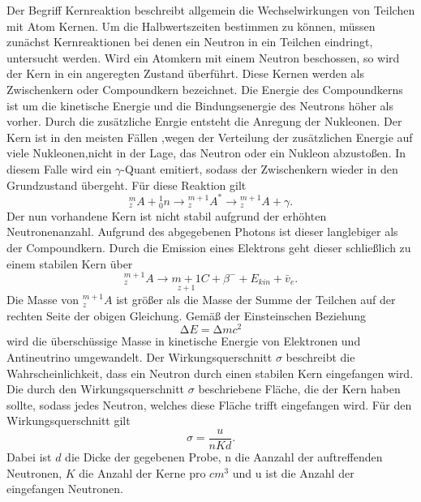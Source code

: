 Der Begriff Kernreaktion beschreibt allgemein die Wechselwirkungen von Teilchen mit Atom Kernen.
Um die Halbwertszeiten bestimmen zu können, müssen zunächst Kernreaktionen bei denen ein Neutron in ein Teilchen
eindringt, untersucht werden. Wird ein Atomkern mit einem Neutron beschossen, so wird der Kern in ein angeregten Zustand überführt.
Diese Kernen werden als Zwischenkern oder Compoundkern bezeichnet.
Die Energie des Compoundkerns ist um die kinetische Energie und die Bindungsenergie des Neutrons höher als
vorher. Durch die zusätzliche Enrgie entsteht die Anregung der Nukleonen. Der Kern ist in den meisten Fällen ,wegen der
Verteilung der zusätzlichen Energie auf viele Nukleonen,nicht in der Lage, das Neutron oder ein Nukleon abzustoßen.
In diesem Falle wird ein $\gamma$-Quant emitiert, sodass der Zwischenkern wieder in den Grundzustand übergeht.
Für diese Reaktion gilt
\begin{equation}
    { }_z^m A+{ }_0^1 n \rightarrow{ }_z^{m+1} A^* \rightarrow{ }_z^{m+1} A+\gamma .
    \label{eqn:vorher}
\end{equation}
Der nun vorhandene Kern ist nicht stabil aufgrund der erhöhten Neutronenanzahl. Aufgrund des abgegebenen
Photons ist dieser langlebiger als der Compoundkern. Durch die Emission eines Elektrons geht dieser schließlich zu einem 
stabilen Kern über
\begin{equation}
    { }_z^{m+1} A \rightarrow \underset{z+1}{m+1} C+\beta^{-}+E_{k i n}+\bar{v}_e .
    \label{eqn:stabil}
\end{equation}
Die Masse von ${ }_z^{m+1} A$ ist größer als die Masse der Summe der Teilchen auf der rechten Seite der obigen Gleichung.
Gemäß der Einsteinschen Beziehung 
\begin{equation*}
    \increment E = \increment m c^2
\end{equation*}
wird die überschüssige Masse in kinetische Energie von Elektronen und Antineutrino umgewandelt.
Der Wirkungsquerschnitt $\sigma$ beschreibt die Wahrscheinlichkeit, dass ein Neutron durch einen stabilen Kern
eingefangen wird. Die durch den Wirkungsquerschnitt $\sigma$ beschriebene Fläche, die der Kern haben sollte,
sodass jedes Neutron, welches diese Fläche trifft eingefangen wird. Für den Wirkungsquerschnitt gilt
\begin{equation}
    \sigma = \frac{u}{nKd}.
    \label{eqn:wirkungs}
\end{equation}
Dabei ist $d$ die Dicke der gegebenen Probe, n die Aanzahl der auftreffenden Neutronen, $K$ die Anzahl der Kerne pro $\si{cm}^3$
und u ist die Anzahl der eingefangen Neutronen.

